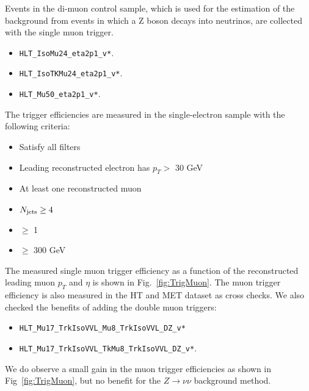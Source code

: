 Events in the di-muon control sample, which is used for the estimation of the background from events in which a Z boson decays into neutrinos, are collected with the single muon trigger. 
\begin{itemize}
  \item \texttt{HLT\_IsoMu24\_eta2p1\_v*}.
  \item \texttt{HLT\_IsoTKMu24\_eta2p1\_v*}.
  \item \texttt{HLT\_Mu50\_eta2p1\_v*}.
\end{itemize}
The trigger efficiencies are measured in the single-electron sample with the following criteria:
\begin{itemize}
  \item Satisfy all filters
	\item Leading reconstructed electron has $p_{T}>$ 30 GeV
  \item At least one reconstructed muon
  \item $N_{\text{jets}}\geq4$
  \item \nbjets $\ge$ 1
  \item \HT $\ge$ 300 GeV
\end{itemize}

The measured single muon trigger efficiency as a function of the reconstructed leading muon $p_{T}$ and $\eta$ is shown in Fig.~\ref{fig:TrigMuon}. The muon trigger efficiency is also measured in the HT and MET dataset as cross checks. We also checked the benefits of adding the double muon triggers: 
\begin{itemize}
  \item \texttt{HLT\_Mu17\_TrkIsoVVL\_Mu8\_TrkIsoVVL\_DZ\_v*}
  \item \texttt{HLT\_Mu17\_TrkIsoVVL\_TkMu8\_TrkIsoVVL\_DZ\_v*}.
\end{itemize}
We do observe a small gain in the muon trigger efficiencies as shown in Fig~\ref{fig:TrigMuon}, but no benefit for the $Z \rightarrow \nu \nu$ background method.

